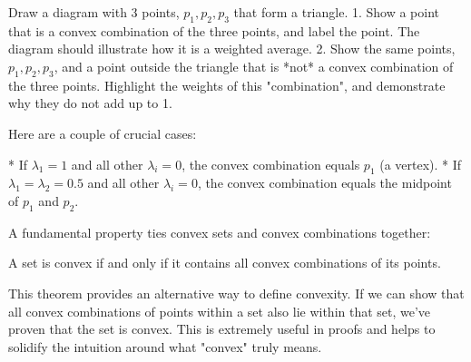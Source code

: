 \begin{visualexample}
\label{vis:convex-combination}
Draw a diagram with 3 points, $p_1, p_2, p_3$ that form a triangle.
1.  Show a point that is a convex combination of the three points, and label the point. The diagram should illustrate how it is a weighted average.
2.   Show the same points, $p_1, p_2, p_3$, and a point outside the triangle that is *not* a convex combination of the three points. Highlight the weights of this "combination", and demonstrate why they do not add up to 1.
\end{visualexample}

Here are a couple of crucial cases:

*   If $\lambda_1 = 1$ and all other $\lambda_i = 0$, the convex combination equals $p_1$ (a vertex).
*   If $\lambda_1 = \lambda_2 = 0.5$ and all other $\lambda_i = 0$, the convex combination equals the midpoint of $p_1$ and $p_2$.

A fundamental property ties convex sets and convex combinations together:

\begin{theorem}
A set is convex if and only if it contains all convex combinations of its points.
\label{thm:convex-comb-equivalence}
\end{theorem}

\begin{mathinsight}
This theorem provides an alternative way to define convexity. If we can show that all convex combinations of points within a set also lie within that set, we've proven that the set is convex. This is extremely useful in proofs and helps to solidify the intuition around what "convex" truly means.
\end{mathinsight}
